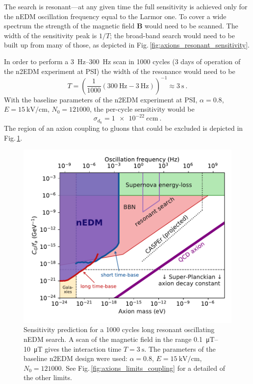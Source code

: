 The search is resonant---at any given time the full sensitivity is achieved only for the nEDM oscillation frequency equal to the Larmor one.
To cover a wide spectrum the strength of the magnetic field $\mathbf{B}$ would need to be scanned.
The width of the sensitivity peak is $1/T$; the broad-band search would need to be built up from many of those, as depicted in Fig.\,\ref{fig:axions_resonant_sensitivity}.

In order to perform a \SIrange[range-phrase=--]{3}{300}{\hertz} scan in 1000 cycles (3 days of operation of the n2EDM experiment at PSI) the width of the resonance would need to be
\begin{equation}
  T = {\left( \frac{1}{1000} \left( \SI{300}{\hertz} - \SI{3}{\hertz} \right)  \right)}^{-1} \approx \SI{3}{\second} \ .
\end{equation}
With the baseline parameters of the n2EDM experiment at PSI, $\alpha = 0.8$, $E = \SI{15}{\kilo\volt\per\centi\metre}$, $N_0 = \num{121000}$, the per-cycle sensitivity would be 
\begin{equation}
  \sigma_{d_\text{n}} = \SI{1e-22}{\elementarycharge\centi\metre} \ .
\end{equation}
The region of an axion coupling to gluons that could be excluded is depicted in Fig.\,\ref{fig:axions_prediction}.

\begin{figure}
  \centering
  \includegraphics[width=\linewidth]{gfx/axions/resonant_search_exclusion_1000cycles_n2EDM.pdf}
  \caption{Sensitivity prediction for a 1000 cycles long resonant oscillating nEDM search. A scan of the magnetic field in the range \SIrange[range-phrase=--]{0.1}{10}{\micro\tesla} gives the interaction time $T = \SI{3}{\second}$. The parameters of the baseline n2EDM design were used: $\alpha = 0.8$, $E = \SI{15}{\kilo\volt\per\centi\metre}$, $N_0 = \num{121000}$. See Fig.\,\ref{fig:axions_limits_coupling} for a detailed of the other limits.}\label{fig:axions_prediction}
\end{figure}


